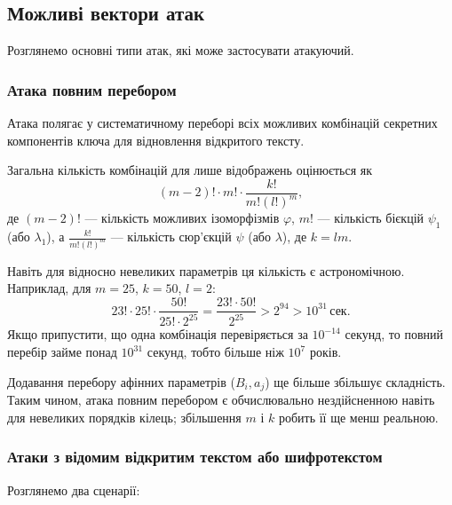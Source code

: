 \subsection{Можливі вектори атак}
\label{subsec:attack_vectors}
Розглянемо основні типи атак, які може застосувати атакуючий.

\subsubsection{Атака повним перебором}
\label{subsubsec:brute_force}

Атака полягає у систематичному переборі всіх можливих комбінацій секретних компонентів ключа для відновлення відкритого тексту.

Загальна кількість комбінацій для лише відображень оцінюється як
\[
(m-2)!\cdot m! \cdot \frac{k!}{m!(l!)^m},
\]
де $(m-2)!$ — кількість можливих ізоморфізмів $\varphi$, $m!$ — кількість бієкцій $\psi_1$ (або $\lambda_1$), а $\frac{k!}{m!(l!)^m}$ — кількість сюр'єкцій $\psi$ (або $\lambda$), де $k=lm$.

Навіть для відносно невеликих параметрів ця кількість є астрономічною.
Наприклад, для $m=25$, $k=50$, $l=2$:
\begin{equation*}
    23! \cdot 25! \cdot \frac{50!}{25! \cdot 2^{25}} = \frac{23! \cdot 50!}{2^{25}} > 2^{94} > 10^{31}\, \text{сек}.
\end{equation*}
Якщо припустити, що одна комбінація перевіряється за $10^{-14}$ секунд, то повний перебір займе понад $10^{31}$ секунд, тобто більше ніж $10^7$ років.

Додавання перебору афінних параметрів ($B_i, a_j$) ще більше збільшує складність.
Таким чином, атака повним перебором є обчислювально нездійсненною навіть для невеликих порядків кілець; збільшення $m$ і $k$ робить її ще менш реальною.

\subsubsection{Атаки з відомим відкритим текстом або шифротекстом}
\label{subsubsec:known_plaintext}

Розглянемо два сценарії:

